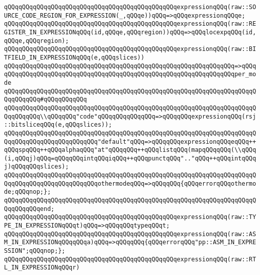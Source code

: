 \verb|qQQqqQQqqQQqqQQqqQQqqQQqqQQqqQQqqQQqqQQqqQQqqQQqexpressionqQQq(raw::SOURCE_CODE_REGION_FOR_EXPRESSION(_,qQQqe))qQQq=>qQQqexpressionqQQqe;|\newline
\verb|qQQqqQQqqQQqqQQqqQQqqQQqqQQqqQQqqQQqqQQqqQQqqQQqexpressionqQQq(raw::REGISTER_IN_EXPRESSIONqQQq(id,qQQqe,qQQqregion))qQQq=>qQQqlocexpqQQq(id,qQQqe,qQQqregion);|\newline
\newline
\verb|qQQqqQQqqQQqqQQqqQQqqQQqqQQqqQQqqQQqqQQqqQQqqQQqexpressionqQQq(raw::BITFIELD_IN_EXPRESSIONqQQq(e,qQQqslices))|\newline
\verb|qQQqqQQqqQQqqQQqqQQqqQQqqQQqqQQqqQQqqQQqqQQqqQQqqQQqqQQqqQQqqQQq=>qQQq|\newline
\verb|qQQqqQQqqQQqqQQqqQQqqQQqqQQqqQQqqQQqqQQqqQQqqQQqqQQqqQQqqQQqqQQqper_mode|\newline
\verb|qQQqqQQqqQQqqQQqqQQqqQQqqQQqqQQqqQQqqQQqqQQqqQQqqQQqqQQqqQQqqQQqqQQqqQQqqQQqqQQq#qQQqqQQqqQQq|\newline
\verb|qQQqqQQqqQQqqQQqqQQqqQQqqQQqqQQqqQQqqQQqqQQqqQQqqQQqqQQqqQQqqQQqqQQqqQQqqQQqqQQq\\qQQqqQQq"code"qQQqqQQqqQQqqQQq=>qQQqqQQqexpressionqQQq(rsj::bitsliceqQQq(e,qQQqslices));|\newline
\verb|qQQqqQQqqQQqqQQqqQQqqQQqqQQqqQQqqQQqqQQqqQQqqQQqqQQqqQQqqQQqqQQqqQQqqQQqqQQqqQQqqQQqqQQqqQQqqQQq"default"qQQq=>qQQqqQQqexpressionqQQqeqQQq++qQQqspqQQq++qQQqalphaqQQq"at"qQQqqQQq++qQQqlistqQQq(mapqQQqqQQq(\\qQQq(i,qQQqj)qQQq=qQQqqQQqintqQQqiqQQq++qQQqpunctqQQq".."qQQq++qQQqintqQQqj)qQQqqQQqslices);|\newline
\verb|qQQqqQQqqQQqqQQqqQQqqQQqqQQqqQQqqQQqqQQqqQQqqQQqqQQqqQQqqQQqqQQqqQQqqQQqqQQqqQQqqQQqqQQqqQQqqQQqothermodeqQQq=>qQQqqQQq{qQQqerrorqQQqothermode;qQQqnop;};|\newline
\verb|qQQqqQQqqQQqqQQqqQQqqQQqqQQqqQQqqQQqqQQqqQQqqQQqqQQqqQQqqQQqqQQqqQQqqQQqqQQqqQQqend;|\newline
\newline
\verb|qQQqqQQqqQQqqQQqqQQqqQQqqQQqqQQqqQQqqQQqqQQqqQQqexpressionqQQq(raw::TYPE_IN_EXPRESSIONqQQqt)qQQq=>qQQqqQQqtypeqQQqt;|\newline
\verb|qQQqqQQqqQQqqQQqqQQqqQQqqQQqqQQqqQQqqQQqqQQqqQQqexpressionqQQq(raw::ASM_IN_EXPRESSIONqQQqqQQqa)qQQq=>qQQqqQQq{qQQqerrorqQQq"pp::ASM_IN_EXPRESSION";qQQqnop;};|\newline
\newline
\verb|qQQqqQQqqQQqqQQqqQQqqQQqqQQqqQQqqQQqqQQqqQQqqQQqexpressionqQQq(raw::RTL_IN_EXPRESSIONqQQqr)|\newline
